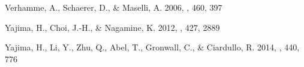 \documentclass{emulateapj}
\begin{document}
\begin{thebibliography}{38}
{Verhamme}, A., {Schaerer}, D., \& {Maselli}, A. 2006, \aap, 460, 397

{Yajima}, H., {Choi}, J.-H., \& {Nagamine}, K. 2012, \mnras, 427, 2889

{Yajima}, H., {Li}, Y., {Zhu}, Q., {Abel}, T., {Gronwall}, C., \& {Ciardullo},
  R. 2014, \mnras, 440, 776

\end{thebibliography}
\end{document}
